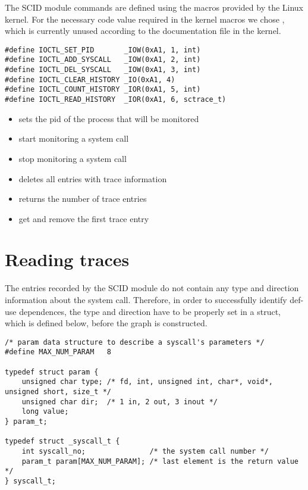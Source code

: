 The SCID module  commands are defined using the macros provided by the Linux kernel. For the necessary code value required in the kernel macros we chose , which is currently unused according to the documentation file in the kernel.

\lstset{language=C,caption=Command macros for ioctl,label=lst:scid-ioctl}
\begin{lstlisting}
#define IOCTL_SET_PID		_IOW(0xA1, 1, int)
#define IOCTL_ADD_SYSCALL	_IOW(0xA1, 2, int)
#define IOCTL_DEL_SYSCALL	_IOW(0xA1, 3, int)
#define IOCTL_CLEAR_HISTORY	_IO(0xA1, 4)
#define IOCTL_COUNT_HISTORY	_IOR(0xA1, 5, int)
#define IOCTL_READ_HISTORY	_IOR(0xA1, 6, sctrace_t)
\end{lstlisting}

\begin{itemize}
	\item {} sets the pid of the process that will be monitored
	\item {} start monitoring a system call
	\item {} stop monitoring a system call
	\item {} deletes all entries with trace information
	\item {} returns the number of trace entries
	\item {} get and remove the first trace entry
\end{itemize}

\section{Reading traces}
\label{fourth:design}

The entries recorded by the SCID module do not contain any type and direction information about the system call. Therefore, in order to successfully identify def-use dependences, the type and direction have to be properly set in a  struct, which is defined below, before the graph is constructed.

\lstset{language=C,caption=parameter data structures,label=lst:param-struct}
\begin{lstlisting}
/* param data structure to describe a syscall's parameters */
#define MAX_NUM_PARAM	8

typedef struct param {
	unsigned char type; /* fd, int, unsigned int, char*, void*, unsigned short, size_t */
	unsigned char dir;  /* 1 in, 2 out, 3 inout */
	long value;
} param_t;

typedef struct _syscall_t {
	int syscall_no;               /* the system call number */
	param_t param[MAX_NUM_PARAM]; /* last element is the return value */
} syscall_t;
\end{lstlisting}

